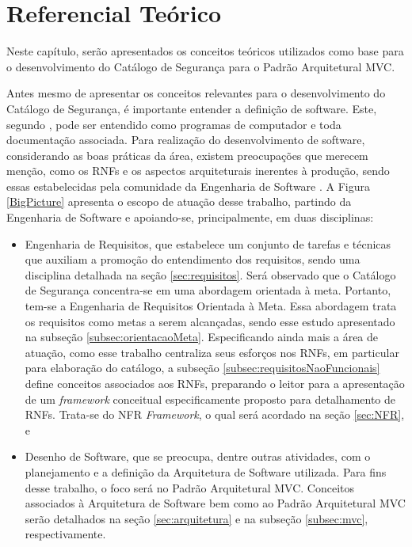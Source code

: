 \chapter[Referencial Teórico]{Referencial Teórico}
\label{chap:referencialTeorico}

Neste capítulo, serão apresentados os conceitos teóricos utilizados como base para o desenvolvimento do Catálogo de Segurança para o Padrão Arquitetural MVC.

Antes mesmo de apresentar os conceitos relevantes para o desenvolvimento do Catálogo de Segurança, é importante entender a definição de software. Este, segundo \cite{sommerville2003engenharia}, pode ser entendido como programas de computador e toda documentação associada. Para realização do desenvolvimento de software, considerando as boas práticas da área, existem preocupações que merecem menção, como os RNFs e os aspectos arquiteturais inerentes à produção, sendo essas estabelecidas pela comunidade da Engenharia de Software \cite{sommerville2003engenharia}. A Figura \ref{BigPicture} apresenta o escopo de atuação desse trabalho, partindo da Engenharia de Software e apoiando-se, principalmente, em duas disciplinas: 

\begin{itemize}
	
	\item Engenharia de Requisitos, que estabelece um conjunto de tarefas e técnicas que auxiliam a promoção do entendimento dos requisitos, sendo uma disciplina detalhada na seção \ref{sec:requisitos}. Será observado que o Catálogo de Segurança concentra-se em uma abordagem orientada à meta. Portanto, tem-se a Engenharia de Requisitos Orientada à Meta. Essa abordagem trata os requisitos como metas a serem alcançadas, sendo esse estudo apresentado na subseção \ref{subsec:orientacaoMeta}. Especificando ainda mais a área de atuação, como esse trabalho centraliza seus esforços nos RNFs, em particular para elaboração do catálogo, a subseção \ref{subsec:requisitosNaoFuncionais} define conceitos associados aos RNFs, preparando o leitor para a apresentação de um \textit{framework} conceitual especificamente proposto para detalhamento de RNFs. Trata-se do NFR \textit{Framework}, o qual será acordado na seção \ref{sec:NFR}, e
	
	\item Desenho de Software, que se preocupa, dentre outras atividades, com o planejamento e a definição da Arquitetura de Software utilizada. Para fins desse trabalho, o foco será no Padrão Arquitetural MVC. Conceitos associados à Arquitetura de Software bem como ao Padrão Arquitetural MVC serão detalhados na seção \ref{sec:arquitetura} e na subseção \ref{subsec:mvc}, respectivamente.
	
\end{itemize}

